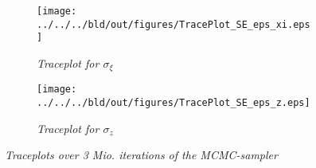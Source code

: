 \begin{figure}[h]
  \begin{subfigure}{.5\textwidth}
    \centering
    \texttt{[image: ../../../bld/out/figures/TracePlot\_SE\_eps\_xi.eps]}
    \caption{\textit{Traceplot for \(\sigma_{\xi}\)}}
    \label{fig:sig_traceplot}
  \end{subfigure}
  \begin{subfigure}{.5\textwidth}
    \centering
    \texttt{[image: ../../../bld/out/figures/TracePlot\_SE\_eps\_z.eps]}
    \caption{\textit{Traceplot for \(\sigma_{z}\)}}
    \label{fig:tfp_traceplot}
  \end{subfigure}
  \caption{\textit{Traceplots over 3 Mio. iterations of the MCMC-sampler}}
  \label{fig:convergence_eps_xi}
\end{figure}
